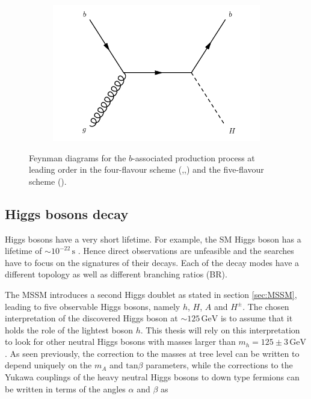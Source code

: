 \begin{figure}
\begin{subfigure}[b]{0.22\textwidth}
  \caption{\label{fig:bbh3}}
\end{subfigure}
\begin{subfigure}[b]{0.22\textwidth}
  \centering
  \includegraphics[width=\textwidth]{Images/bbh4.pdf}
  \caption{\label{fig:bbh4}}
\end{subfigure}%
\caption{Feynman diagrams for the $b$-associated production process at leading order in the four-flavour scheme (,,) and the five-flavour scheme ().}
\label{fig:bbh}
\end{figure}

\subsection{Higgs bosons decay}

Higgs bosons have a very short lifetime. For example, the SM Higgs boson has a lifetime of $\sim 10^{-22} \, \mathrm{s}$ \cite{pdg2016}. Hence direct observations are unfeasible and the searches have to focus on the signatures of their decays. Each of the decay modes have a different topology as well as different branching ratios (BR). 

The MSSM introduces a second Higgs doublet as stated in section \ref{sec:MSSM}, leading to five observable Higgs bosons, namely $h$, $H$, $A$ and $H^{\pm}$. The chosen interpretation of the discovered Higgs boson at $\sim 125\, \mathrm{GeV}$ is to assume that it holds the role of the lightest boson $h$. This thesis will rely on this interpretation to look for other neutral Higgs bosons with masses larger than $m_h = 125 \pm 3 \, \mathrm{GeV}$. As seen previously, the correction to the masses at tree level can be written to depend uniquely on the $m_A$ and $\mathrm{tan} \beta$ parameters, while the corrections to the Yukawa couplings of the heavy neutral Higgs bosons to down type fermions can be written in terms of the angles $\alpha$ and $\beta$ as

